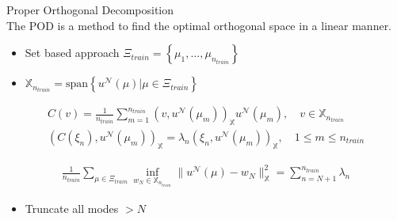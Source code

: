 \begin{frame}{Proper Orthogonal Decomposition}
	\Large{}\\ \normalsize
	The POD is a method to find the optimal orthogonal space in a linear manner.

	
	\begin{itemize}
		\item Set based approach $\Xi_{train} = \left\{ \mu_{1},..., \mu_{n_{train}} \right\}$
		\item $\mathbb{X}_{n_{train}} = \text{span}\left\{ u^\mathcal{ N }(\mu) | \mu \in \Xi_{train} \right\}$
	\end{itemize}

	\Large{} \normalsize
	\begin{align*}
	C(v) =
	\frac{1}{n_{train}}
	\sum_{m=1}^{n_{train}} 
	\left( v ,u^\mathcal{N}(\mu_{m}) \right)_\mathbb{X} u^\mathcal{N}(\mu_{m}) 
	, \quad 
	v \in \mathbb{X}_{n_{train}}
	\\
	\left(C(\xi_n),u^\mathcal{N}(\mu_{m})\right)_\mathbb{X}
	=
	\lambda_n \left(\xi_n,u^\mathcal{N}(\mu_{m}) \right)_\mathbb{X}
	, \quad 
	1 \leq m \leq n_{train}
	\end{align*}

	\Large{} \normalsize
	\begin{align*}
	\frac{1}{n_{train}}
	\sum_{ \mu \in \Xi_{train} }   
	\inf_{ w_N \in \mathbb{X}_{n_{train}} } \| u^\mathcal{N}(\mu) - w_N \|_\mathbb{X}^2 
	=
	\sum_{n=N+1}^{n_{train}}\lambda_{n}
	\end{align*}
	
	\begin{itemize}
		\item Truncate all modes $> N$
	\end{itemize}

	\end{frame}


